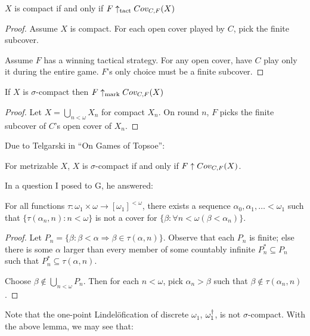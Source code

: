   \begin{proposition}
    $X$ is compact if and only if $F \uparrow_{\text{tact}} Cov_{C,F}(X)$
  \end{proposition}

  \begin{proof}
    Assume $X$ is compact. For each open cover played by $C$, pick the finite subcover.

    Assume $F$ has a winning tactical strategy. For any open cover, have $C$ play only it during the entire game. $F$'s only choice must be a finite subcover.
  \end{proof}

  \begin{proposition}
    If $X$ is $\sigma$-compact then $F \uparrow_{\text{mark}} Cov_{C,F}(X)$
  \end{proposition}

  \begin{proof}
    Let $X=\bigcup_{n<\omega} X_n$ for compact $X_n$. On round $n$, $F$ picks the finite subcover of $C$'s open cover of $X_n$.
  \end{proof}

  Due to Telgarski in ``On Games of Topsoe'':

  \begin{theorem}
    For metrizable $X$, $X$ is $\sigma$-compact if and only if $F \uparrow Cov_{C,F}(X)$.
  \end{theorem}

  In a question I posed to G, he answered:

  \begin{lemma}
    For all functions $\tau:\omega_1\times\omega \rightarrow [\omega_1]^{<\omega}$, there exists a sequence $\alpha_0, \alpha_1, \dots < \omega_1$ such that $\{\tau(\alpha_n,n): n<\omega\}$ is not a cover for $\{\beta:\forall n<\omega (\beta < \alpha_n)\}$.
  \end{lemma} 

  \begin{proof}
    Let $P_n = \{\beta: \beta < \alpha \Rightarrow \beta \in \tau(\alpha, n)\}$. Observe that each $P_n$ is finite; else there is some $\alpha$ larger than every member of some countably infinite $P_n^*\subseteq P_n$ such that $P_n^* \subseteq \tau(\alpha, n)$.

    Choose $\beta \not\in \bigcup_{n<\omega} P_n$. Then for each $n<\omega$, pick $\alpha_n>\beta$ such that $\beta \not\in \tau(\alpha_n, n)$.
  \end{proof}

  Note that the one-point Lindel\"ofication of discrete $\omega_1$, $\omega_1^\dagger$, is not $\sigma$-compact. With the above lemma, we may see that:

